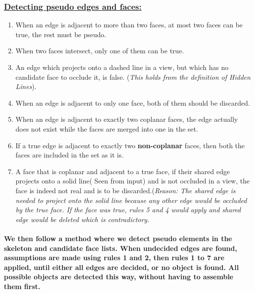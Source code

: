 \documentclass[12pt]{article}
\begin{document}
\bigskip

\subsubsection{\large{\underline{Detecting pseudo edges and faces:}}}

\begin{enumerate}
    \item When an edge is adjacent to more than two faces, at most two faces can be true, the rest must be pseudo.
    
    \item When two faces intersect, only one of them can be true.
    
    \item An edge which projects onto a dashed line in a view, but which has no candidate face to occlude it, is false. (\emph{This holds from the definition of Hidden Lines}).
    
    \item When an edge is adjacent to only one face, both of them should be discarded.
    
    \item When an edge is adjacent to exactly two coplanar faces, the edge actually does not exist while the faces are merged into one in the set.
    
    \item If a true edge is adjacent to exactly two \textbf{non-coplanar} faces, then both the faces are included in the set as it is.
    
    \item A face that is coplanar and adjacent to a true face, if their shared edge projects onto a solid line( Seen from input) and is not occluded in a view, the face is indeed not real and is to be discarded.(\emph{Reason: The shared edge is needed to project onto the solid line because any other edge would be occluded by the true face. If the face was true, rules 5 and 4 would apply and shared edge would be deleted which is contradictory.}
    
    
\end{enumerate}

\bigskip
\paragraph{We then follow a method where we detect pseudo elements in the skeleton and candidate face lists. When undecided edges are found, assumptions are made using rules 1 and 2, then rules 1 to 7 are applied, until either all edges are decided, or no object is found. All possible objects are detected this way, without having to assemble them first.
}
    
\end{document}
